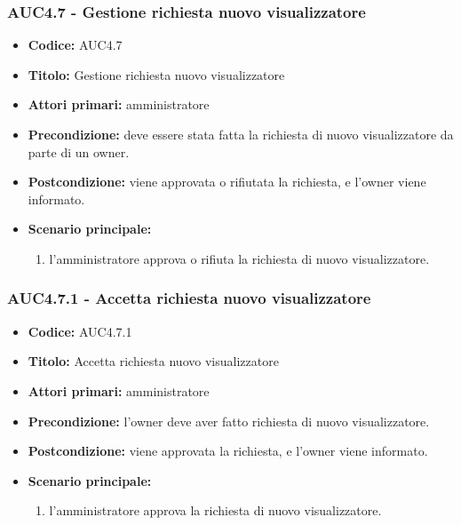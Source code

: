 \documentclass[casi-duso]{subfiles}
\begin{document}
\subsubsection{AUC4.7 - Gestione richiesta nuovo visualizzatore}%
\label{subsub:AUC4.7}
\begin{itemize}
  \item \textbf{Codice:} AUC4.7
  \item \textbf{Titolo:} Gestione richiesta nuovo visualizzatore
  \item \textbf{Attori primari:} amministratore
  \item \textbf{Precondizione:} deve essere stata fatta la richiesta di nuovo visualizzatore da parte di un owner.
  \item \textbf{Postcondizione:} viene approvata o rifiutata la richiesta, e l'owner viene informato.
  \item \textbf{Scenario principale:}
  \begin{enumerate}
    \item l'amministratore approva o rifiuta la richiesta di nuovo visualizzatore.
  \end{enumerate}
\end{itemize}


\subsubsection{AUC4.7.1 - Accetta richiesta nuovo visualizzatore}%
\label{subsub:AUC4.7.1}
\begin{itemize}
  \item \textbf{Codice:} AUC4.7.1
  \item \textbf{Titolo:} Accetta richiesta nuovo visualizzatore
  \item \textbf{Attori primari:} amministratore
  \item \textbf{Precondizione:} l'owner deve aver fatto richiesta di nuovo visualizzatore.
  \item \textbf{Postcondizione:} viene approvata la richiesta, e l'owner viene informato.
  \item \textbf{Scenario principale:}
  \begin{enumerate}
    \item l'amministratore approva la richiesta di nuovo visualizzatore.
  \end{enumerate}
\end{itemize}  
\end{document}
